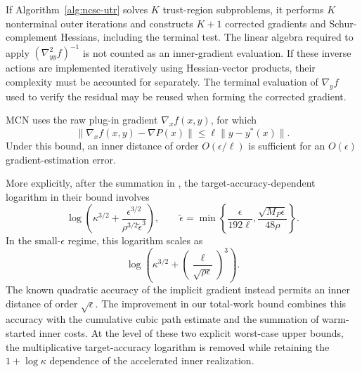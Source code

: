 \begin{remark}
\label{rem:known-parameter-oracle-accounting}
If Algorithm~\ref{alg:ncsc-utr} solves $K$ trust-region subproblems,
it performs $K$ nonterminal outer iterations and constructs
$K+1$ corrected gradients and Schur-complement Hessians, including
the terminal test.
The linear algebra required to apply
$(\nabla^2_{yy}f)^{-1}$ is not counted as an inner-gradient
evaluation. If these inverse actions are implemented iteratively using
Hessian-vector products, their complexity must be accounted for
separately.
The terminal evaluation of $\nabla_yf$ used to verify the residual
may be reused when forming the corrected gradient.
\end{remark}

\begin{remark}
\label{rem:comparison-mcn}
MCN \citep{luo2022finding} uses the raw plug-in gradient
$\nabla_xf(x,y)$, for which
\begin{equation}
    \|\nabla_xf(x,y)-\nabla P(x)\|
    \le
    \ell\|y-y^*(x)\|.
    \label{eq:mcn-raw-gradient-error}
\end{equation}
Under this bound, an inner distance of order $O(\epsilon/\ell)$
is sufficient for an $O(\epsilon)$ gradient-estimation error.

More explicitly, after the summation in
\citet[Theorem~2]{luo2022finding}, the target-accuracy-dependent
logarithm in their bound involves
\begin{equation}
    \log\!\left(
        \kappa^{3/2}
        +
        \frac{\epsilon^{3/2}}
        {\rho^{3/2}\widetilde\epsilon^3}
    \right),
    \qquad
    \widetilde\epsilon
    =
    \min\left\{
        \frac{\epsilon}{192\ell},
        \frac{\sqrt{M_P\epsilon}}{48\rho}
    \right\}.
    \label{eq:mcn-explicit-log}
\end{equation}
In the small-$\epsilon$ regime, this logarithm scales as
\begin{equation}
    \log\!\left(
        \kappa^{3/2}
        +
        \left(
            \frac{\ell}{\sqrt{\rho\epsilon}}
        \right)^3
    \right).
    \label{eq:mcn-small-epsilon-log}
\end{equation}
The known quadratic accuracy of the implicit gradient
\citep{ablin2020superefficiency} instead permits an inner distance of
order $\sqrt\epsilon$.
The improvement in our total-work bound combines this accuracy with
the cumulative cubic path estimate and the summation of warm-started
inner costs. At the level of these two explicit worst-case upper
bounds, the multiplicative target-accuracy logarithm is removed
while retaining the $1+\log\kappa$ dependence of the accelerated
inner realization.
\end{remark}
